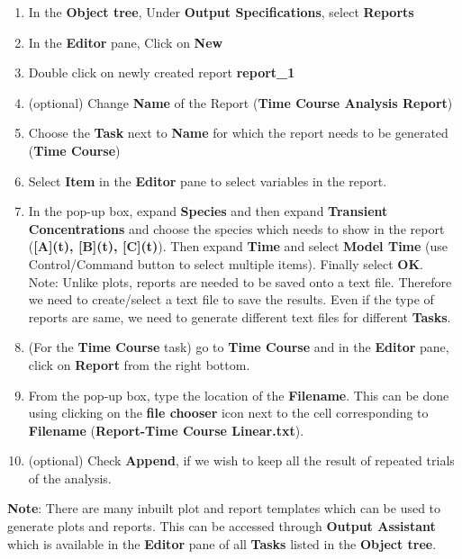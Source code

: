 \documentclass[10pt]{article}
\theoremstyle{definition}
\theoremstyle{remark}
\begin{document}
	\begin{enumerate}[start=1]\def\makelabel{\textbf{Step}~}
		\item In the \textbf{Object tree}, Under \textbf{Output Specifications}, select \textbf{Reports}
		\item In the \textbf{Editor} pane, Click on \textbf{New}
		\item Double click on newly created report \textbf{report\_1}
		\item (optional) Change \textbf{Name} of the Report (\textbf{Time Course Analysis Report})
		\item Choose the \textbf{Task} next to \textbf{Name} for which the report needs to be generated (\textbf{Time Course})
		\item Select \textbf{Item} in the \textbf{Editor} pane to select variables in the report.
		\item In the pop-up box, expand \textbf{Species} and then expand \textbf{Transient Concentrations} and choose the species which needs to show in the report (\textbf{[A](t), [B](t), [C](t)}). Then expand \textbf{Time} and select \textbf{Model Time} (use Control/Command button to select multiple items). Finally select \textbf{OK}.\\
		Note: Unlike plots, reports are needed to be saved onto a text file. Therefore we need to create/select a text file to save the results. Even if the type of reports are same, we need to generate different text files for different \textbf{Tasks}.
		\item (For the \textbf{Time Course} task) go to \textbf{Time Course} and in the \textbf{Editor} pane, click on \textbf{Report} from the right bottom.
		\item From the pop-up box, type the location of the \textbf{Filename}. This can be done using clicking on the \textbf{file chooser} icon next to the cell corresponding to \textbf{Filename} (\textbf{Report-Time Course Linear.txt}).
		\item (optional) Check \textbf{Append}, if we wish to keep all the result of repeated trials of the analysis.\\
	\end{enumerate} 
	
	\textbf{Note}: There are many inbuilt plot and report templates which can be used to generate plots and reports. This can be accessed through \textbf{Output Assistant} which is available in the \textbf{Editor} pane of all \textbf{Tasks} listed in the \textbf{Object tree}.
	
\end{document}
